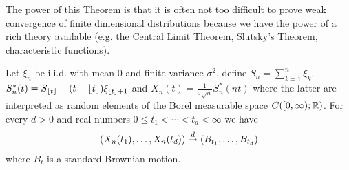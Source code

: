 The power of this Theorem is that it is often not too difficult to
prove weak convergence of finite dimensional distributions because we
have the power of a rich theory available (e.g. the Central Limit
Theorem, Slutsky's Theorem, characteristic functions).

\begin{lem}\label{ConvergenceOfRandomWalkFDD}Let $\xi_n$ be i.i.d. with mean $0$ and finite variance
  $\sigma^2$, define $S_n = \sum_{k=1}^n \xi_k$, $S_n^*(t) =
  S_{\left \lfloor t \right \rfloor} + (t - \left \lfloor t \right \rfloor)\xi_{\left \lfloor t \right \rfloor+1}$ and
  $X_n(t) = \frac{1}{\sigma \sqrt{n}} S_n^*(nt)$ where the latter are
  interpreted as random elements of the Borel measurable space
  $C([0,\infty);\mathbb{R})$.  For every $d > 0$ and real numbers $0 \leq t_1 < \cdots < t_d
  < \infty$ we have 
\begin{align*}
(X_n(t_1), \dotsc, X_n(t_d)) \overset{d}\to (B_{t_1}, \dotsc, B_{t_d})
\end{align*}
where $B_t$ is a standard Brownian motion.
\end{lem}
